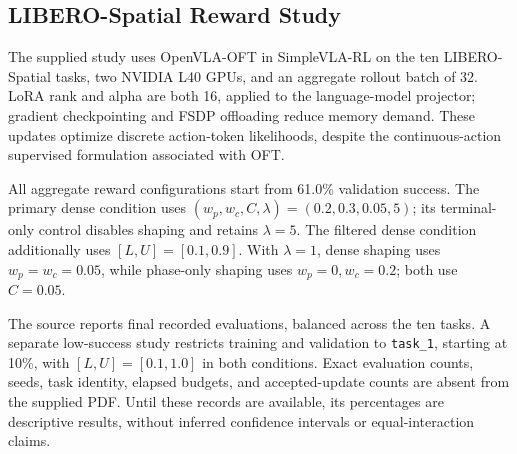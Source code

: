 \subsection{LIBERO-Spatial Reward Study}\label{sec:libero_setup}
The supplied study uses OpenVLA-OFT in SimpleVLA-RL on the ten LIBERO-Spatial tasks, two NVIDIA L40 GPUs, and an aggregate rollout batch of 32. LoRA rank and alpha are both 16, applied to the language-model projector; gradient checkpointing and FSDP offloading reduce memory demand. These updates optimize discrete action-token likelihoods, despite the continuous-action supervised formulation associated with OFT. 

All aggregate reward configurations start from 61.0\% validation success. The primary dense condition uses $(w_p,w_c,C,\lambda)=(0.2,0.3,0.05,5)$; its terminal-only control disables shaping and retains $\lambda=5$. The filtered dense condition additionally uses $[L,U]=[0.1,0.9]$. With $\lambda=1$, dense shaping uses $w_p=w_c=0.05$, while phase-only shaping uses $w_p=0,w_c=0.2$; both use $C=0.05$.

The source reports final recorded evaluations, balanced across the ten tasks. A separate low-success study restricts training and validation to \texttt{task\_1}, starting at 10\%, with $[L,U]=[0.1,1.0]$ in both conditions. Exact evaluation counts, seeds, task identity, elapsed budgets, and accepted-update counts are absent from the supplied PDF. Until these records are available, its percentages are descriptive results, without inferred confidence intervals or equal-interaction claims.

